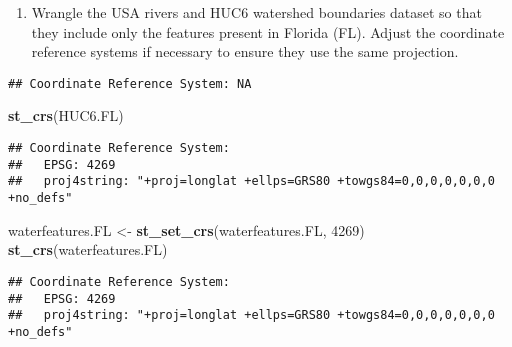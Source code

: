 \documentclass[]{article}
\newenvironment{Shaded}{\begin{snugshade}}{\end{snugshade}}
\newcommand{\DecValTok}[1]{\textcolor[rgb]{0.00,0.00,0.81}{#1}}
\newcommand{\KeywordTok}[1]{\textcolor[rgb]{0.13,0.29,0.53}{\textbf{#1}}}
\newcommand{\NormalTok}[1]{#1}
\newcommand{\OperatorTok}[1]{\textcolor[rgb]{0.81,0.36,0.00}{\textbf{#1}}}
\newcommand{\StringTok}[1]{\textcolor[rgb]{0.31,0.60,0.02}{#1}}
\providecommand{\tightlist}{%
  \setlength{\itemsep}{0pt}\setlength{\parskip}{0pt}}
\begin{document}
\begin{enumerate}
\def\labelenumi{\arabic{enumi}.}
\setcounter{enumi}{9}
\tightlist
\item
  Wrangle the USA rivers and HUC6 watershed boundaries dataset so that
  they include only the features present in Florida (FL). Adjust the
  coordinate reference systems if necessary to ensure they use the same
  projection.
\end{enumerate}

\begin{Shaded}
\end{Shaded}

\begin{verbatim}
## Coordinate Reference System: NA
\end{verbatim}

\begin{Shaded}
\begin{Highlighting}[]
\KeywordTok{st_crs}\NormalTok{(HUC6.FL)}
\end{Highlighting}
\end{Shaded}

\begin{verbatim}
## Coordinate Reference System:
##   EPSG: 4269 
##   proj4string: "+proj=longlat +ellps=GRS80 +towgs84=0,0,0,0,0,0,0 +no_defs"
\end{verbatim}

\begin{Shaded}
\begin{Highlighting}[]
\NormalTok{waterfeatures.FL <-}\StringTok{ }\KeywordTok{st_set_crs}\NormalTok{(waterfeatures.FL, }\DecValTok{4269}\NormalTok{)}
\KeywordTok{st_crs}\NormalTok{(waterfeatures.FL)}
\end{Highlighting}
\end{Shaded}

\begin{verbatim}
## Coordinate Reference System:
##   EPSG: 4269 
##   proj4string: "+proj=longlat +ellps=GRS80 +towgs84=0,0,0,0,0,0,0 +no_defs"
\end{verbatim}
\end{document}
